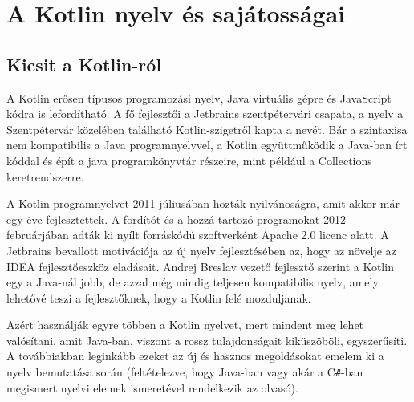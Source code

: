 


\chapter{A Kotlin nyelv és sajátosságai}
\label{chap:03_kotlin}

\section{Kicsit a Kotlin-ról}
\label{sec:k_about}

A Kotlin erősen típusos programozási nyelv, Java virtuális gépre és JavaScript kódra is lefordítható. A fő fejlesztői a Jetbrains szentpétervári csapata, a nyelv a Szentpétervár közelében található Kotlin-szigetről kapta a nevét. Bár a szintaxisa nem kompatibilis a Java programnyelvvel, a Kotlin együttműködik a Java-ban írt kóddal és épít a java programkönyvtár részeire, mint például a Collections keretrendszerre.

A Kotlin programnyelvet 2011 júliusában hozták nyilvánoságra, amit akkor már egy éve fejlesztettek. A fordítót és a hozzá tartozó programokat 2012 februárjában adták ki nyílt forráskódú szoftverként Apache 2.0 licenc alatt. A Jetbrains bevallott motivációja az új nyelv fejlesztésében az, hogy az növelje az IDEA fejlesztőeszköz eladásait. Andrej Breslav vezető fejlesztő szerint a Kotlin egy a Java-nál jobb, de azzal még mindig teljesen kompatibilis nyelv, amely lehetővé teszi a fejlesztőknek, hogy a Kotlin felé mozduljanak.

Azért használják egyre többen a Kotlin nyelvet, mert mindent meg lehet valósítani, amit Java-ban, viszont a rossz tulajdonságait kiküszöböli, egyszerűsíti. A továbbiakban leginkább ezeket az új és hasznos megoldásokat emelem ki a nyelv bemutatása során (feltételezve, hogy Java-ban vagy akár a C\verb|#|-ban megismert nyelvi elemek ismeretével rendelkezik az olvasó).

